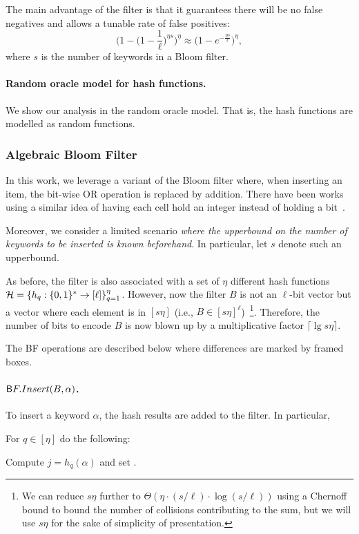 The main advantage of the filter is that it guarantees there will be no
false negatives and allows a tunable rate of false positives: 
$$
\bigg(1 - \Big (1 - \frac{1}{ \ell} \Big )^{\eta s} \bigg)^\eta
\approx 
\Big(1 - e^{-\frac{\eta s}{ \ell}} \Big)^\eta,
$$
where $s$ is the number of keywords in a Bloom filter. 

\paragraph{Random oracle model for hash functions.}
We show our analysis in the random oracle model. That is, the hash
functions are modelled as random functions. 

\subsubsection{Algebraic Bloom Filter}
\label{sec:ABF}
In this work, we leverage a variant of the Bloom filter where, when
inserting an item, the bit-wise OR operation is replaced by addition.
There have been works using a similar idea of having each cell hold an
integer instead of holding a bit~\cite{TON:FCAB00, PODC:Mitzenmacher01}. 

Moreover, we consider a limited scenario {\em where the upperbound on the
number of keywords to be inserted is known beforehand}. In particular,
let $s$ denote such an upperbound. 

As before, the filter is also associated with a set of $\eta$ different
hash functions  $\HHH = \{ h_q: \zo^* \to [\ell] \}_{q=1}^\eta$.
However, now the filter $B$ is not an $\ell$-bit vector but a vector
where each element is in $[s \eta]$ (i.e., $B \in
[s\eta]^\ell$)~\footnote{We can reduce $s \eta$ further to $\Theta( \eta \cdot
(s/\ell) \cdot \log (s/\ell))$ using a Chernoff bound to bound the number of collisions contributing to the sum, but we will use $s\eta$ for
the sake of simplicity of presentation.}.
Therefore, the number of bits to encode $B$ is now blown up by
a multiplicative factor $\lceil \lg s\eta \rceil$. 

The BF operations are described below where differences are marked by
framed boxes. 

\paragraph{$\sf BF.Insert(B, \alpha)$.}
To insert a keyword $\alpha$, the hash results are added to the
filter. In particular, 
  \BI
  \item For $q \in [\eta]$ do the following:
    \BI
    \item[] 
    Compute $j = h_q(\alpha)$ and set . 
    \EI
  \EI



